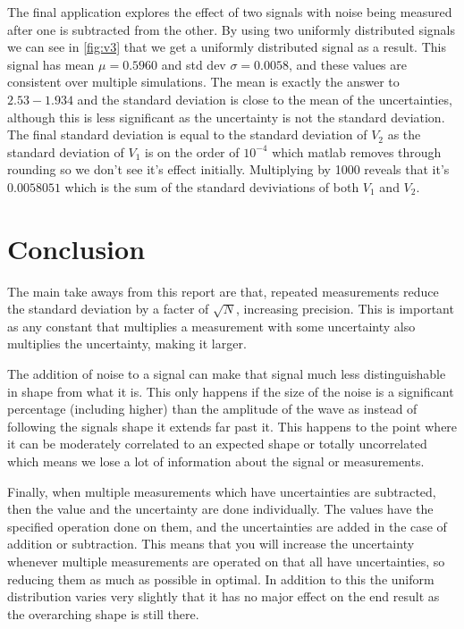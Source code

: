 \documentclass[a4paper, 12pt]{article}
\begin{document}
            The final application explores the effect of two signals with noise being measured after one is subtracted from the other. By using two uniformly distributed signals we can see in \cref{fig:v3} that we get a uniformly distributed signal as a result. This signal has mean $\mu = 0.5960$ and std dev $\sigma = 0.0058$, and these values are consistent over multiple simulations. The mean is exactly the answer to $2.53-1.934$ and the standard deviation is close to the mean of the uncertainties, although this is less significant as the uncertainty is not the standard deviation. The final standard deviation is equal to the standard deviation of $V_2$ as the standard deviation of $V_1$ is on the order of $10^{-4}$ which matlab removes through rounding so we don't see it's effect initially. Multiplying by 1000 reveals that it's $0.0058051$ which is the sum of the standard deviviations of both $V_1$ and $V_2$. 


    \section{Conclusion}
        The main take aways from this report are that, repeated measurements reduce the standard deviation by a facter of $\sqrt{N}$, increasing precision. This is important as any constant that multiplies a measurement with some uncertainty also multiplies the uncertainty, making it larger.
        \par
        The addition of noise to a signal can make that signal much less distinguishable in shape from what it is. This only happens if the size of the noise is a significant percentage (including higher) than the amplitude of the wave as instead of following the signals shape it extends far past it. This happens to the point where it can be moderately correlated to an expected shape or totally uncorrelated which means we lose a lot of information about the signal or measurements.
        \par
        Finally, when multiple measurements which have uncertainties are subtracted, then the value and the uncertainty are done individually. The values have the specified operation done on them, and the uncertainties are added in the case of addition or subtraction. This means that you will increase the uncertainty whenever multiple measurements are operated on that all have uncertainties, so reducing them as much as possible in optimal. In addition to this the uniform distribution varies very slightly that it has no major effect on the end result as the overarching shape is still there. 
    
    
\end{document}
